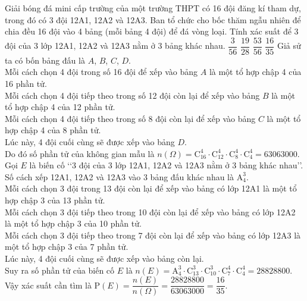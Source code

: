 \begin{ex}%
	Giải bóng đá mini cấp trường của một trường THPT có 16 đội đăng kí tham dự, trong đó có 3 đội 12A{\small 1}, 12A{\small 2} và 12A{\small 3}. Ban tổ chức cho bốc thăm ngẫu nhiên để chia đều 16 đội vào 4 bảng (mỗi bảng 4 đội) để đá vòng loại. Tính xác suất để 3 đội của 3 lớp 12A{\small 1}, 12A{\small 2} và 12A{\small 3} nằm ở 3 bảng khác nhau.
	\choice
	{$\dfrac{3}{56}$}
	{$\dfrac{19}{28}$}
	{$\dfrac{53}{56}$}
	{\True $\dfrac{16}{35}$}
	\loigiai
	{
		Giả sử ta có bốn bảng đấu là $A$, $B$, $C$, $D$.\\
		Mỗi cách chọn 4 đội trong số 16 đội để xếp vào bảng $A$ là một tổ hợp chập 4 của 16 phần tử.\\
		Mỗi cách chọn 4 đội tiếp theo trong số 12 đội còn lại để xếp vào bảng $B$ là một tổ hợp chập 4 của 12 phần tử.\\
		Mỗi cách chọn 4 đội tiếp theo trong số 8 đội còn lại để xếp vào bảng $C$ là một tổ hợp chập 4 của 8 phần tử.\\
		Lúc này, 4 đội cuối cùng sẽ được xếp vào bảng $D$.\\
		Do đó số phần tử của không gian mẫu là $n(\Omega)= \mathrm{C}_{16}^4 \cdot \mathrm{C}_{12}^4 \cdot \mathrm{C}_{8}^4 \cdot \mathrm{C}_{4}^4  = 63063000$.\\
		Gọi $E$ là biến cố \lq\lq  3 đội của 3 lớp 12A{\small 1}, 12A{\small 2} và 12A{\small 3} nằm ở 3 bảng khác nhau\rq\rq.\\
		Số cách xếp 12A{\small 1}, 12A{\small 2} và 12A{\small 3} vào 3 bảng đấu khác nhau là $\mathrm{A}_4^3$.\\		
		Mỗi cách chọn 3 đội trong 13 đội còn lại  để xếp vào bảng có lớp 12A{\small 1} là một tổ hợp chập 3 của 13 phần tử.\\		
		Mỗi cách chọn 3 đội tiếp theo trong 10 đội còn lại  để xếp vào bảng có lớp 12A{\small 2} là một tổ hợp chập 3 của 10 phần tử.\\		
		Mỗi cách chọn 3 đội tiếp theo trong 7 đội còn lại để xếp vào bảng có lớp 12A{\small 3} là một tổ hợp chập 3 của 7 phần tử.\\		
		Lúc này, 4 đội cuối cùng sẽ được xếp vào bảng còn lại.\\
		Suy ra số phần tử của biến cố $E$ là $n(E)= \mathrm{A}_4^3 \cdot \mathrm{C}_{13}^3 \cdot \mathrm{C}_{10}^3 \cdot \mathrm{C}_{7}^4 \cdot \mathrm{C}_{4}^4 = 28828800$.\\
		Vậy xác suất cần tìm là $\mathrm{P}(E)= \dfrac{n(E)}{n(\Omega)}= \dfrac{28828800}{63063000}= \dfrac{16}{35}$.
	}
\end{ex}

